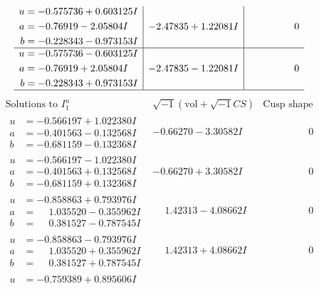\documentclass[1p]{elsarticle_modified}
\theoremstyle{definition}
\newcommand{\I}{\sqrt{-1}}
\begin{document}
$$\begin{array}{c|c|c}
\begin{aligned}
u &= -0.575736 + 0.603125 I \\
a &= -0.76919 - 2.05804 I \\
b &= -0.228343 - 0.973153 I\end{aligned}
 & -2.47835 + 1.22081 I & \phantom{-0.000000 } 0 \\ \hline\begin{aligned}
u &= -0.575736 - 0.603125 I \\
a &= -0.76919 + 2.05804 I \\
b &= -0.228343 + 0.973153 I\end{aligned}
 & -2.47835 - 1.22081 I & \phantom{-0.000000 } 0\\
 \hline 
 \end{array}$$\newpage$$\begin{array}{c|c|c}  
\text{Solutions to }I^u_{1}& \I (\text{vol} + \sqrt{-1}CS) & \text{Cusp shape}\\
 \hline 
\begin{aligned}
u &= -0.566197 + 1.022380 I \\
a &= -0.401563 - 0.132568 I \\
b &= -0.681159 - 0.132368 I\end{aligned}
 & -0.66270 - 3.30582 I & \phantom{-0.000000 } 0 \\ \hline\begin{aligned}
u &= -0.566197 - 1.022380 I \\
a &= -0.401563 + 0.132568 I \\
b &= -0.681159 + 0.132368 I\end{aligned}
 & -0.66270 + 3.30582 I & \phantom{-0.000000 } 0 \\ \hline\begin{aligned}
u &= -0.858863 + 0.793976 I \\
a &= \phantom{-}1.035520 - 0.355962 I \\
b &= \phantom{-}0.381527 - 0.787545 I\end{aligned}
 & \phantom{-}1.42313 - 4.08662 I & \phantom{-0.000000 } 0 \\ \hline\begin{aligned}
u &= -0.858863 - 0.793976 I \\
a &= \phantom{-}1.035520 + 0.355962 I \\
b &= \phantom{-}0.381527 + 0.787545 I\end{aligned}
 & \phantom{-}1.42313 + 4.08662 I & \phantom{-0.000000 } 0 \\ \hline\begin{aligned}
u &= -0.759389 + 0.895606 I \\

\end{aligned}
\end{array}$$
\end{document}

